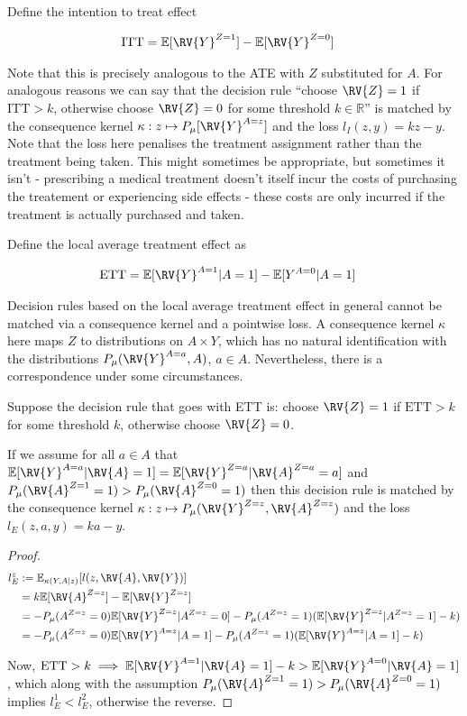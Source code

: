 Define the intention to treat effect

\begin{align}
    \text{ITT} &= \mathbb{E}[\RV{Y}^{Z=1}] - \mathbb{E}[\RV{Y}^{Z=0}]
\end{align}

Note that this is precisely analogous to the ATE with $Z$ substituted for $A$. For analogous reasons we can say that the decision rule ``choose $\RV{Z}=1$ if $\text{ITT}>k$, otherwise choose $\RV{Z}=0$ for some threshold $k\in \mathbb{R}$'' is matched by the consequence kernel $\kappa:z\mapsto P_{\mu}[\RV{Y}^{A=z}]$ and the loss $l_{I}(z,y)=kz - y$. Note that the loss here penalises the treatment assignment rather than the treatment being taken. This might sometimes be appropriate, but sometimes it isn't - prescribing a medical treatment doesn't itself incur the costs of purchasing the treatement or experiencing side effects - these costs are only incurred if the treatment is actually purchased and taken.

Define the local average treatment effect as \cite{shpitser_effects_2009}

\begin{align}
    \text{ETT} &= \mathbb{E}[\RV{Y}^{A=1}|A=1] - \mathbb{E}[Y^{A=0}|A=1]
\end{align}

Decision rules based on the local average treatment effect in general cannot be matched via a consequence kernel and a pointwise loss. A consequence kernel $\kappa$ here maps $Z$ to distributions on $A\times Y$, which has no natural identification with the distributions $P_\mu(\RV{Y}^{A=a},A)$, $a\in A$. Nevertheless, there is a correspondence under some circumstances.

Suppose the decision rule that goes with ETT is: choose $\RV{Z}=1$ if $\text{ETT}>k$ for some threshold $k$, otherwise choose $\RV{Z}=0$.

If we assume for all $a\in A$ that $\mathbb{E}[\RV{Y}^{A=a}|\RV{A}=1]=\mathbb{E}[\RV{Y}^{Z=a}|\RV{A}^{Z=a}=a]$ and $P_\mu(\RV{A}^{Z=1}=1)>P_\mu(\RV{A}^{Z=0}=1)$ then this decision rule is matched by the consequence kernel $\kappa:z\mapsto P_\mu(\RV{Y}^{Z=z},\RV{A}^{Z=z})$ and the loss $l_E(z,a,y)=ka-y$.

\begin{proof}
\begin{align}
    l^z_E &:= \mathbb{E}_{\kappa(Y,A|z)}[l(z,\RV{A},\RV{Y})] \\
    &= k\mathbb{E}[\RV{A}^{Z=z}] - \mathbb{E}[\RV{Y}^{Z=z}]\\
    &= - P_\mu(A^{Z=z}=0)\mathbb{E}[\RV{Y}^{Z=z}|A^{Z=z}=0] - P_\mu(A^{Z=z}=1)(\mathbb{E}[\RV{Y}^{Z=z}|A^{Z=z}=1]-k)\\
    &= - P_\mu(A^{Z=z}=0)\mathbb{E}[\RV{Y}^{A=z}|A=1] - P_\mu(A^{Z=z}=1)(\mathbb{E}[\RV{Y}^{A=z}|A=1]-k)
\end{align}

Now, $\text{ETT}>k\implies \mathbb{E}[\RV{Y}^{A=1}|\RV{A}=1]-k>\mathbb{E}[\RV{Y}^{A=0}|\RV{A}=1]$, which along with the assumption $P_\mu(\RV{A}^{Z=1}=1)>P_\mu(\RV{A}^{Z=0}=1)$ implies $l^1_E < l^2_E$, otherwise the reverse.
\end{proof}

